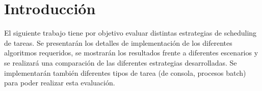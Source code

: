 \section{Introducci\'on}

El siguiente trabajo tiene por objetivo evaluar distintas estrategias de scheduling de tareas. Se presentar\'an los detalles de implementaci\'on de los diferentes algoritmos requeridos, se mostrar\'an los resultados frente a diferentes escenarios y se realizar\'a una comparaci\'on de las diferentes estrategias desarrolladas. Se implementar\'an tambi\'en diferentes tipos de tarea (de consola, procesos batch) para poder realizar esta evaluaci\'on.

